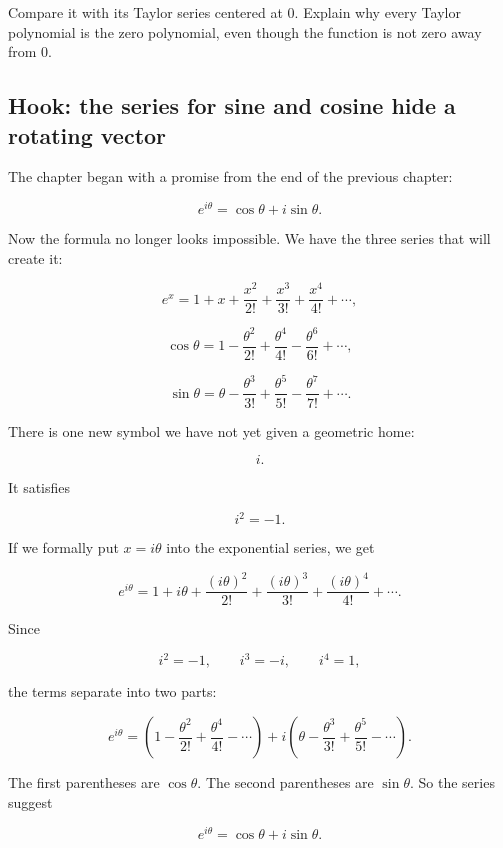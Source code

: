 Compare it with its Taylor series centered at \(0\).  Explain why every Taylor polynomial
is the zero polynomial, even though the function is not zero away from \(0\).

\subsection{Hook: the series for sine and cosine hide a rotating vector}
\label{subsec:hook-sine-cosine-rotating-vector}

The chapter began with a promise from the end of the previous chapter:

\[
e^{i\theta}=\cos\theta+i\sin\theta.
\]

Now the formula no longer looks impossible.  We have the three series that will create it:

\[
e^x
=
1+x+\frac{x^2}{2!}+\frac{x^3}{3!}
+\frac{x^4}{4!}+\cdots,
\]

\[
\cos \theta
=
1-\frac{\theta^2}{2!}+\frac{\theta^4}{4!}
-\frac{\theta^6}{6!}+\cdots,
\]

\[
\sin \theta
=
\theta-\frac{\theta^3}{3!}+\frac{\theta^5}{5!}
-\frac{\theta^7}{7!}+\cdots.
\]

There is one new symbol we have not yet given a geometric home:

\[
i.
\]

It satisfies

\[
i^2=-1.
\]

If we formally put \(x=i\theta\) into the exponential series, we get

\[
e^{i\theta}
=
1+i\theta+\frac{(i\theta)^2}{2!}
+\frac{(i\theta)^3}{3!}
+\frac{(i\theta)^4}{4!}
+\cdots.
\]

Since

\[
i^2=-1,\qquad i^3=-i,\qquad i^4=1,
\]

the terms separate into two parts:

\[
e^{i\theta}
=
\left(
1-\frac{\theta^2}{2!}
+\frac{\theta^4}{4!}
-\cdots
\right)
+
i\left(
\theta-\frac{\theta^3}{3!}
+\frac{\theta^5}{5!}
-\cdots
\right).
\]

The first parentheses are \(\cos\theta\).  The second parentheses are \(\sin\theta\).
So the series suggest

\[
\boxed{
e^{i\theta}=\cos\theta+i\sin\theta.
}
\]

